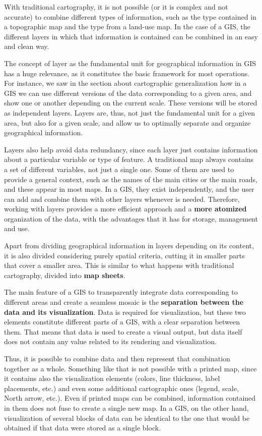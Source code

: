 With traditional cartography, it is not possible (or it is complex and not accurate) to combine different types of information, such as the type contained in a topographic map and the type from a land-use map. In the case of a GIS, the different layers in which that information is contained can be combined in an easy and clean way.

The concept of layer as the fundamental unit for geographical information in GIS has a huge relevance, as it constitutes the basic framework for most operations. For instance, we saw in the section about cartographic generalization how in a GIS we can use different versions of the data corresponding to a given area, and show one or another depending on the current scale. These versions will be stored as independent layers. Layers are, thus, not just the fundamental unit for a given area, but also for a given scale, and allow us to optimally separate and organize geographical information. 

Layers also help avoid data redundancy, since each layer just contains information about a particular variable or type of feature. A traditional map always contains a set of different variables, not just a single one. Some of them are used to provide a general context, such as the names of the main cities or the main roads, and these appear in most maps. In a GIS, they exist independently, and the user can add and combine them with other layers whenever is needed. Therefore, working with layers provides a more efficient approach and a \textbf{more atomized} organization of the data, with the advantages that it has for storage, management and use.

Apart from dividing geographical information in layers depending on its content, it is also divided considering purely spatial criteria, cutting it in smaller parts that cover a smaller area. This is similar to what happens with traditional cartography, divided into \textbf{map sheets}.

The main feature of a GIS to transparently integrate data corresponding to different areas and create a seamless mosaic is the \textbf{separation between the data and its visualization}. Data is required for visualization, but these two elements constitute different parts of a GIS, with a clear separation between them. That means that data is used to create a visual output, but data itself does not contain any value related to its rendering and visualization.

Thus, it is possible to combine data and then represent that combination together as a whole. Something like that is not possible with a printed map, since it contains also the visualization elements (colors, line thickness, label placements, etc.) and even some additional cartographic ones (legend, scale, North arrow, etc.). Even if printed maps can be combined, information contained in them does not fuse to create a single new map. In a GIS, on the other hand, visualization of several blocks of data can be identical to the one that would be obtained if that data were stored as a single block.


